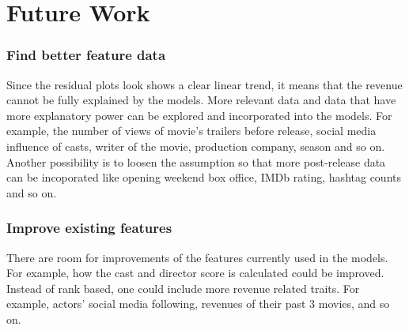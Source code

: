 \documentclass[11pt]{article}
\begin{document}
\section{Future Work}\label{future-work}

\subsubsection{Find better feature data}\label{find-better-feature-data}

Since the residual plots look shows a clear linear trend, it means that 
the revenue cannot be fully explained by the models.  More relevant data and data
that have more explanatory power can be explored and incorporated into
the models. For example, the number of views of movie's trailers before
release, social media influence of casts, writer of the movie,
production company, season and so on. Another possibility is to loosen
the assumption so that more post-release data can be incoporated like
opening weekend box office, IMDb rating, hashtag counts and so on.

\subsubsection{Improve existing
features}\label{improve-existing-features}

There are room for improvements of the features currently used in the
models. For example, how the cast and director score is calculated could
be improved. Instead of rank based, one could include more revenue
related traits. For example, actors' social media following, revenues of
their past 3 movies, and so on.
  
\end{document}

